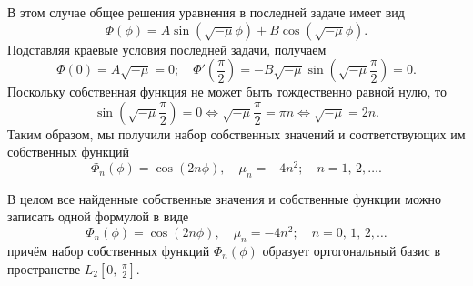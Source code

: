 \documentclass[a4paper]{article}
\begin{document}
\begin{sol}
\begin{enumerate}
\begin{itemize}
	В этом случае общее решения уравнения в последней
	задаче имеет вид
	\[
		\Phi(\phi)=A \sin \left( \sqrt{-\mu} \phi \right) +B \cos \left( \sqrt{-\mu} \phi \right) 
	.\] 
	Подставляя краевые условия последней задачи, получаем
	\[
		\Phi(0)=A \sqrt{-\mu} =0;\quad
		\Phi'\left( \frac{\pi}{2} \right) =
		-B\sqrt{-\mu} \sin \left( \sqrt{-\mu} 
		\frac{\pi}{2}\right) =0
	.\] 
	Поскольку собственная функция не может быть тождественно
	равной нулю, то
	\[
		\sin \left( \sqrt{-\mu} \frac{\pi}{2} \right) =
		0 \Leftrightarrow \sqrt{-\mu} \frac{\pi}{2}=
		\pi n \Leftrightarrow \sqrt{-\mu} =2n
	.\] 
	Таким образом, мы получили набор собственных значений
	и соответствующих им собственных функций
	\[
		\Phi_n(\phi)=\cos (2n\phi),\quad
		\mu_n=-4n^2;\quad n=1,\,2,\ldots
	.\] 
\end{itemize}
В целом все найденные собственные значения и собственные
функции можно записать одной формулой в виде
\[
	\Phi_n(\phi)=\cos (2n\phi),\quad
	\mu_n=-4n^2;\quad n=0,\,1,\,2,\ldots
\]
причём набор собственных функций $\Phi_n(\phi)$ образует
ортогональный базис в пространстве $\displaystyle L_2 \left[ 0,\,
\frac{\pi}{2}\right] $.


\end{enumerate}
\end{sol}
\end{document}
